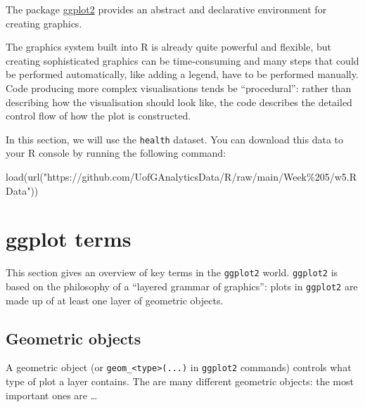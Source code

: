 \documentclass[
]{book}
\newenvironment{Shaded}{\begin{snugshade}}{\end{snugshade}}
\newcommand{\FunctionTok}[1]{\textcolor[rgb]{0.00,0.00,0.00}{#1}}
\newcommand{\NormalTok}[1]{#1}
\newcommand{\StringTok}[1]{\textcolor[rgb]{0.31,0.60,0.02}{#1}}
\begin{document}
The package \href{http://ggplot2.tidyverse.org/}{ggplot2} provides an abstract and declarative environment for creating graphics.

The graphics system built into R is already quite powerful and flexible, but creating sophisticated graphics can be time-consuming and many steps that could be performed automatically, like adding a legend, have to be performed manually. Code producing more complex visualisations tends be ``procedural'': rather than describing how the visualisation should look like, the code describes the detailed control flow of how the plot is constructed.

In this section, we will use the \texttt{health} dataset. You can download this data to your R console by running the following command:

\begin{Shaded}
\begin{Highlighting}[]
\FunctionTok{load}\NormalTok{(}\FunctionTok{url}\NormalTok{(}\StringTok{"https://github.com/UofGAnalyticsData/R/raw/main/Week\%205/w5.RData"}\NormalTok{))}
\end{Highlighting}
\end{Shaded}

\hypertarget{ggplot-terms}{%
\section{ggplot terms}\label{ggplot-terms}}

This section gives an overview of key terms in the \texttt{ggplot2} world. \texttt{ggplot2} is based on the philosophy of a ``layered grammar of graphics'': plots in \texttt{ggplot2} are made up of at least one layer of geometric objects.

\hypertarget{geometric-objects}{%
\subsection{Geometric objects}\label{geometric-objects}}

A geometric object (or \texttt{geom\_\textless{}type\textgreater{}(...)} in \texttt{ggplot2} commands) controls what type of plot a layer contains. The are many different geometric objects: the most important ones are \ldots{}
\end{document}
